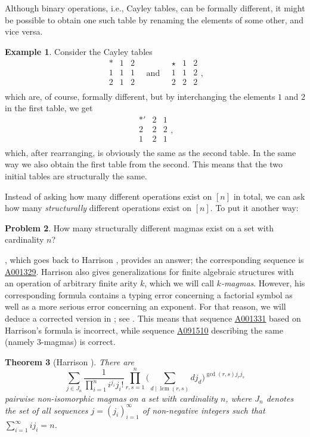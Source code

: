 \documentclass[12pt]{article}
\let\Cref\crtCref
\newcommand{\seqnum}[1]{\href{https://oeis.org/#1}{\rm \underline{#1}}}
\DeclareMathOperator{\lcm}{lcm}
\newtheorem{theorem}{Theorem}
\theoremstyle{definition}
\newtheorem{example}[theorem]{Example}
\newtheorem{problem}[theorem]{Problem}
\theoremstyle{remark}
\begin{document}
	Although binary operations, i.e., Cayley tables, can be formally different, it might be possible to obtain one such table by renaming the elements of some other, and vice versa.
	\begin{example}\label{ex:tables}
		Consider the Cayley tables
		\[
		\begin{array}{c|cc}
			\ast & 1 & 2 \\ \hline
			1 & 1 & 1 \\ 
			2 & 1 & 2 \\
		\end{array}
		\quad\text{and}\quad
		\begin{array}{c|cc}
			\star & 1 & 2 \\ \hline
			1 & 1 & 2 \\ 
			2 & 2 & 2 \\
		\end{array},
		\]
		which are, of course, formally different, but by interchanging the elements $1$ and $2$ in the first table, we get
		\[
		\begin{array}{c|cc}
			\ast' & 2 & 1 \\ \hline
			2 & 2 & 2 \\ 
			1 & 2 & 1 \\
		\end{array},
		\]
		which, after rearranging, is obviously the same as the second table. In the same way we also obtain the first table from the second. This means that the two initial tables are structurally the same.
	\end{example}
	Instead of asking how many different operations exist on $[n]$ in total, we can ask how many \emph{structurally} different operations exist on $[n]$. To put it another way:
	\begin{problem}
		How many structurally different magmas exist on a set with cardinality $n$?
	\end{problem}
	\Cref{thm:main}, which goes back to Harrison \cite[Theorem 4]{H}, provides an answer; the corresponding sequence is \seqnum{A001329}. Harrison also gives generalizations for finite algebraic structures with an operation of arbitrary finite arity $k$, which we will call \emph{$k$-magmas}. However, his corresponding formula \cite[Theorem 5]{H} contains a typing error concerning a factorial symbol as well as a more serious error concerning an exponent. For that reason, we will deduce a corrected version in \Cref{sec:gen}; see \Cref{thm:main_k}. This means that sequence \seqnum{A001331} based on Harrison's formula is incorrect, while sequence \seqnum{A091510} describing the same (namely $3$-magmas) is correct.
	\begin{theorem}[Harrison \cite{H}]\label{thm:main}
		There are 
		\[
		\sum_{j \in J_n} \frac{1}{\prod_{i=1}^n i^{j_i} j_i!} \prod_{r,s=1}^n \bigg(\sum_{d\mid\lcm(r,s)} d j_d\bigg)^{\gcd(r,s)j_rj_s}
		\]
		pairwise non-isomorphic magmas on a set with cardinality $n$, where $J_n$ denotes the set of all sequences $j=(j_i)_{i=1}^{\infty}$ of non-negative integers such that $\sum_{i=1}^{\infty} ij_i = n$.
	\end{theorem}
	
\end{document}
